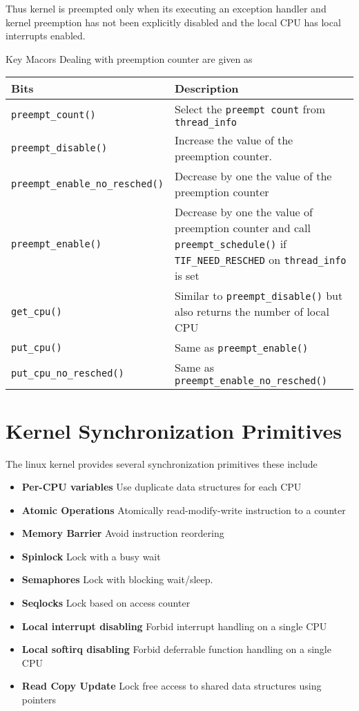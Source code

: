 \documentclass{article}
\begin{document}
Thus kernel is preempted only when its executing an exception handler
and kernel preemption has not been explicitly disabled and the local
CPU has local interrupts enabled.

Key Macors Dealing with preemption counter are given as 

\begin{center}
  \begin{tabular}{ l | p{9 cm} }    
    \hline
    Bits & Description                    \\ \hline
    \lstinline{preempt_count()} & Select the \lstinline{preempt count} from \lstinline{thread_info}    \\ 
    \lstinline{preempt_disable()} & Increase the value of the preemption counter.     \\ 
    \lstinline{preempt_enable_no_resched()} &  Decrease by one the value of the preemption counter  \\
    \lstinline{preempt_enable()} & Decrease by one the value of preemption counter and call \lstinline{preempt_schedule()} if \lstinline{TIF_NEED_RESCHED} on \lstinline{thread_info} is set \\
    \lstinline{get_cpu()} & Similar to \lstinline{preempt_disable()} but also returns the number of local CPU \\
    \lstinline{put_cpu()} & Same as  \lstinline{preempt_enable()} \\
    \lstinline{put_cpu_no_resched()} & Same as \lstinline{preempt_enable_no_resched()}    \\
    \hline
  \end{tabular}
\end{center}


\section{Kernel Synchronization Primitives}

The linux kernel provides several synchronization primitives these
include

\begin{itemize}
\item \textbf{Per-CPU variables}
  Use duplicate data structures for each CPU
\item \textbf{Atomic Operations}
  Atomically read-modify-write instruction to a counter
\item \textbf{Memory Barrier}
  Avoid instruction reordering
\item  \textbf{Spinlock}
  Lock with a busy wait
\item \textbf{Semaphores}
  Lock with blocking wait/sleep.
\item \textbf{Seqlocks}
  Lock based on access counter
\item \textbf{Local interrupt disabling}
  Forbid interrupt handling on a single CPU
\item \textbf{Local softirq disabling}
  Forbid deferrable function handling on a single CPU
\item \textbf{Read Copy Update}
  Lock free access to shared data structures using pointers
\end{itemize}
\end{document}
